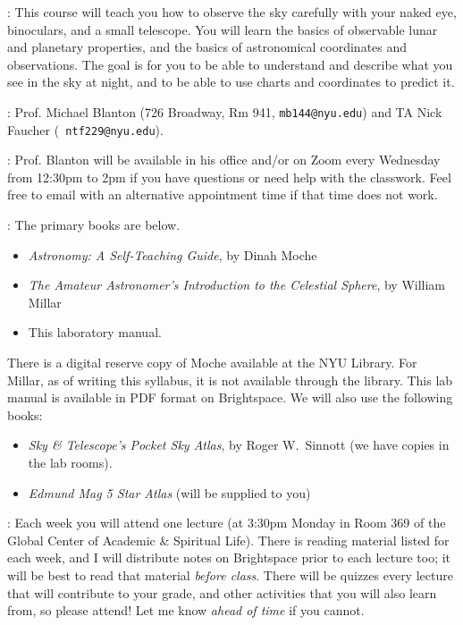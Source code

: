 
: This course will teach you how to
observe the sky carefully with your naked eye, binoculars, and a small
telescope. You will learn the basics of observable lunar and planetary
properties, and the basics of astronomical coordinates and
observations. The goal is for you to be able to understand and
describe what you see in the sky at night, and to be able to use
charts and coordinates to predict it.

: Prof. Michael Blanton (726 Broadway,
Rm 941, {\tt mb144@nyu.edu}) and TA Nick Faucher ({\tt
  ntf229@nyu.edu}).

: Prof. Blanton will be available in
  his office and/or on Zoom every Wednesday from 12:30pm to 2pm if you
  have questions or need help with the classwork. Feel free to email
  with an alternative appointment time if that time does not work.
 
: The primary books are below.
\begin{itemize}
\item {\it Astronomy: A Self-Teaching Guide}, by Dinah Moche
\item {\it The Amateur Astronomer's Introduction to the Celestial
  Sphere}, by William Millar
\item This laboratory manual. 
\end{itemize}
There is a digital reserve copy of Moche available at the NYU
Library. For Millar, as of writing this syllabus, it is not
available through the library. This lab manual is available in PDF
format on Brightspace. We will also use the following books:
\begin{itemize}
\item {\it Sky \& Telescope's Pocket Sky Atlas}, by Roger W.~Sinnott
(we have copies in the lab rooms).
\item {\it Edmund Mag 5 Star Atlas} (will be supplied to you)
\end{itemize}

: Each week you will attend one lecture
(at 3:30pm Monday in Room 369 of the Global Center of Academic \&
Spiritual Life). There is reading material listed for each week, and I
will distribute notes on Brightspace prior to each lecture too; it
will be best to read that material {\it before class}.  There will be
quizzes every lecture that will contribute to your grade, and other
activities that you will also learn from, so please attend! Let me
know {\it ahead of time} if you cannot.

